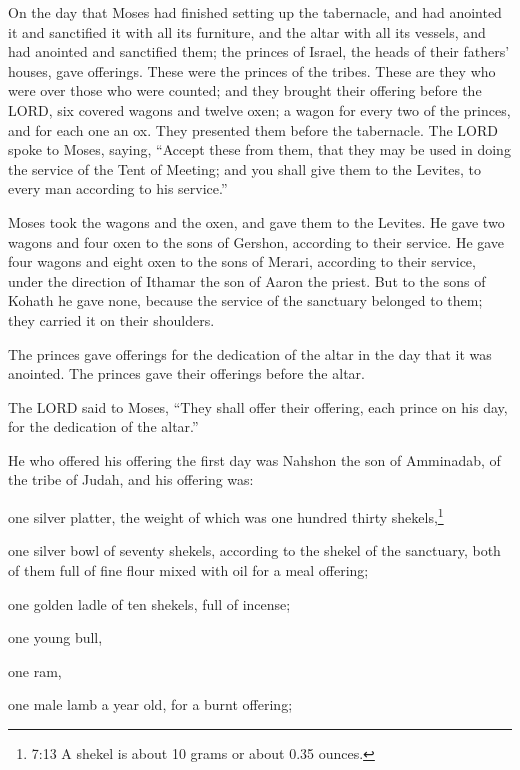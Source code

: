 \mychapter{} \myverse*{}On the day that Moses had finished setting up the tabernacle, and
had anointed it and sanctified it with all its furniture, and the altar with all its vessels, and had
anointed and sanctified them;
\myverse{}the princes of Israel, the heads of their fathers’ houses, gave offerings. These
were the princes of the tribes. These are they who were over those who were counted;
\myverse{}and they brought their offering before the LORD, six covered wagons and twelve
oxen; a wagon for every two of the princes, and for each one an ox. They presented them before the tabernacle.
\myverse{}The LORD spoke to Moses, saying,
\myverse{}“Accept these from them, that they may be used in doing the service of the Tent
of Meeting; and you shall give them to the Levites, to every man according to his service.”


\myverse{}Moses took the wagons and the oxen, and gave them to the Levites.
\myverse{}He gave two wagons and four oxen to the sons of Gershon, according to their
service.
\myverse{}He gave four wagons and eight oxen to the sons of Merari, according to their
service, under the direction of Ithamar the son of Aaron the priest.
\myverse{}But to the sons of Kohath he gave none, because the service of the sanctuary
belonged to them; they carried it on their shoulders.


\myverse{}The princes gave offerings for the dedication of the altar in
the day that it was anointed. The princes gave their offerings before the altar.


\myverse{}The LORD said to Moses, “They shall offer their offering, each
prince on his day, for the dedication of the altar.”


\myverse{}He who offered his offering the first day was Nahshon the son
of Amminadab, of the tribe of Judah,
\myverse{}and his offering was:

one silver platter, the weight of which was one hundred thirty shekels,\footnote{ 7:13 A shekel is about 10 grams or about 0.35 ounces.}

one silver bowl of seventy shekels, according to the shekel of the sanctuary, both of them
full of fine flour mixed with oil for a meal offering;


\myverse{}one golden ladle of ten shekels, full of incense;


\myverse{}one young bull,

one ram,

one male lamb a year old, for a burnt offering;


